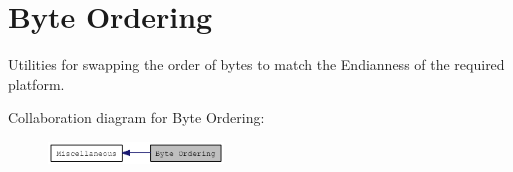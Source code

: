 \hypertarget{group__byteorder}{
\section{Byte Ordering}
\label{group__byteorder}
}


Utilities for swapping the order of bytes to match the Endianness of the required platform.  


Collaboration diagram for Byte Ordering:\nopagebreak
\begin{figure}[H]
\begin{center}
\leavevmode
\includegraphics[width=132pt]{group__byteorder}
\end{center}
\end{figure}
